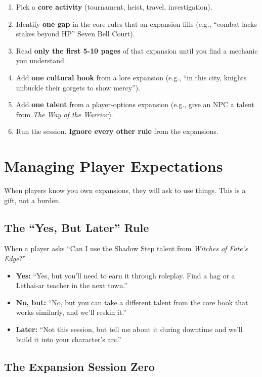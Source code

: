 \begin{enumerate}
\item Pick a \textbf{core activity} (tournament, heist, travel, investigation).
\item Identify \textbf{one gap} in the core rules that an expansion fills (e.g., ``combat lacks stakes beyond HP'' \rightarrow Seven Bell Court).
\item Read \textbf{only the first 5-10 pages} of that expansion until you find a mechanic you understand.
\item Add \textbf{one cultural hook} from a lore expansion (e.g., ``in this city, knights unbuckle their gorgets to show mercy'').
\item Add \textbf{one talent} from a player-options expansion (e.g., give an NPC a talent from \textit{The Way of the Warrior}).
\item Run the session. \textbf{Ignore every other rule} from the expansions.
\end{enumerate}

\section{Managing Player Expectations}

When players know you own expansions, they will ask to use things. This is a gift, not a burden.

\subsection{The ``Yes, But Later'' Rule}

When a player asks ``Can I use the Shadow Step talent from \textit{Witches of Fate's Edge}?''

\begin{itemize}
\item \textbf{Yes:} ``Yes, but you'll need to earn it through roleplay. Find a hag or a Lethai-ar teacher in the next town.''
\item \textbf{No, but:} ``No, but you can take a different talent from the core book that works similarly, and we'll reskin it.''
\item \textbf{Later:} ``Not this session, but tell me about it during downtime and we'll build it into your character's arc.''
\end{itemize}

\subsection{The Expansion Session Zero}

